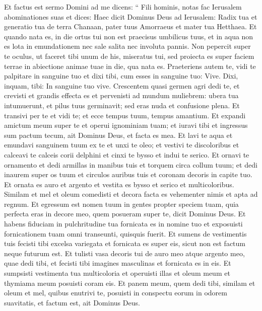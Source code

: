 \begin{biblechapter}
\begin{biblechapter}
\begin{biblechapter}
\begin{biblechapter}
\begin{biblechapter}
\begin{biblechapter}
\begin{biblechapter}
\begin{biblechapter}
\begin{biblechapter}
\begin{biblechapter}
\begin{biblechapter}
\begin{biblechapter}
\begin{biblechapter}
\begin{biblechapter}
\begin{biblechapter}
\begin{biblechapter}
\verse Et factus est sermo Domini ad me dicens: 
\verse “ Fili hominis, notas fac Ierusalem abominationes suas 
\verse et dices: Haec dicit Dominus Deus ad Ierusalem: Radix tua et generatio tua de terra Chanaan, pater tuus Amorraeus et mater tua Hetthaea. 
\verse Et quando nata es, in die ortus tui non est praecisus umbilicus tuus, et in aqua non es lota in emundationem nec sale salita nec involuta pannis. 
\verse Non pepercit super te oculus, ut faceret tibi unum de his, miseratus tui, sed proiecta es super faciem terrae in abiectione animae tuae in die, qua nata es.
 \verse Praeteriens autem te, vidi te palpitare in sanguine tuo et dixi tibi, cum esses in sanguine tuo: Vive. Dixi, inquam, tibi: In sanguine tuo vive. 
\verse Crescentem quasi germen agri dedi te, et crevisti et grandis effecta es et pervenisti ad mundum muliebrem: ubera tua intumuerunt, et pilus tuus germinavit; sed eras nuda et confusione plena. 
\verse Et transivi per te et vidi te; et ecce tempus tuum, tempus amantium. Et expandi amictum meum super te et operui ignominiam tuam; et iuravi tibi et ingressus sum pactum tecum, ait Dominus Deus, et facta es mea. 
\verse Et lavi te aqua et emundavi sanguinem tuum ex te et unxi te oleo; 
\verse et vestivi te discoloribus et calceavi te calceis corii delphini et cinxi te bysso et indui te serico. 
\verse Et ornavi te ornamento et dedi armillas in manibus tuis et torquem circa collum tuum; 
\verse et dedi inaurem super os tuum et circulos auribus tuis et coronam decoris in capite tuo. 
\verse Et ornata es auro et argento et vestita es bysso et serico et multicoloribus. Similam et mel et oleum comedisti et decora facta es vehementer nimis et apta ad regnum. 
\verse Et egressum est nomen tuum in gentes propter speciem tuam, quia perfecta eras in decore meo, quem posueram super te, dicit Dominus Deus.
 \verse Et habens fiduciam in pulchritudine tua fornicata es in nomine tuo et exposuisti fornicationem tuam omni transeunti, quisquis fuerit. 
\verse Et sumens de vestimentis tuis fecisti tibi excelsa variegata et fornicata es super eis, sicut non est factum neque futurum est. 
\verse Et tulisti vasa decoris tui de auro meo atque argento meo, quae dedi tibi, et fecisti tibi imagines masculinas et fornicata es in eis. 
\verse Et sumpsisti vestimenta tua multicoloria et operuisti illas et oleum meum et thymiama meum posuisti coram eis. 
\verse Et panem meum, quem dedi tibi, similam et oleum et mel, quibus enutrivi te, posuisti in conspectu eorum in odorem suavitatis, et factum est, ait Dominus Deus.

\end{biblechapter}
\end{biblechapter}
\end{biblechapter}
\end{biblechapter}
\end{biblechapter}
\end{biblechapter}
\end{biblechapter}
\end{biblechapter}
\end{biblechapter}
\end{biblechapter}
\end{biblechapter}
\end{biblechapter}
\end{biblechapter}
\end{biblechapter}
\end{biblechapter}
\end{biblechapter}
